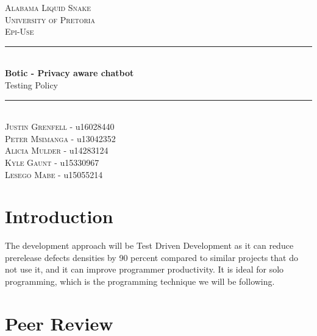 \documentclass[11pt]{article}
\begin{document}
\renewcommand{\familydefault}{\sfdefault}
\begin{titlepage}
	\newcommand{\HRule}{\rule{\linewidth}{0.5mm}}
	\begin{center}
		            
		\textsc{\LARGE Alabama Liquid Snake}\\[0.8cm]
		\textsc{\Large University of Pretoria}\\[0.5cm]
		\textsc{\large Epi-Use}\\[0.5cm]
		    
		\HRule\\[0.4cm]
		    	
		{\huge\bfseries Botic - Privacy aware chatbot}\\[0.2cm]
		    	
		{\huge Testing Policy}\\[0.2cm]
		
		\HRule\\[0.5cm]
		
		\textsc{Justin Grenfell} - u16028440 \\[0cm]
		\textsc{Peter Msimanga} - u13042352 \\[0cm]
		\textsc{Alicia Mulder} - u14283124 \\[0cm]
		\textsc{Kyle Gaunt} - u15330967 \\[0cm]
		\textsc{Lesego Mabe} - u15055214 \\[0cm]
		    
	\end{center}
\end{titlepage}
\tableofcontents
\newpage

\section{Introduction}

The development approach will be Test Driven Development as it can reduce prerelease defects densities by 90 percent compared to similar projects that do not use it, and it can improve programmer productivity\cite{Book:1}. It is ideal for solo programming\cite{Book:1}, which is the programming technique we will be following.

\section{Peer Review}
\end{document}
